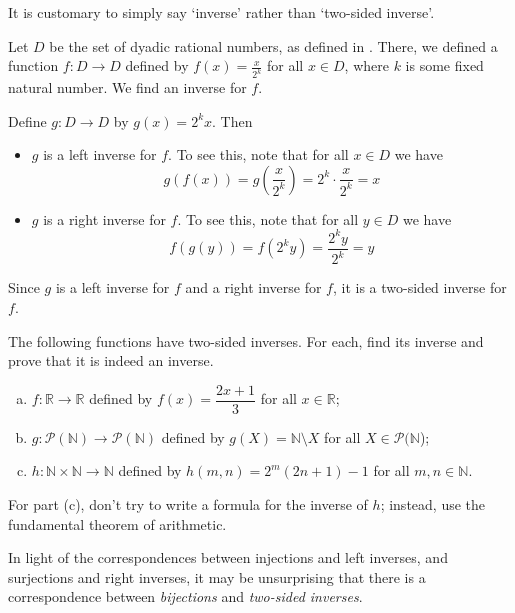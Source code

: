 It is customary to simply say `inverse' rather than `two-sided inverse'.

\begin{example}
Let $D$ be the set of dyadic rational numbers, as defined in . There, we defined a function $f : D \to D$ defined by $f(x)=\frac{x}{2^k}$ for all $x \in D$, where $k$ is some fixed natural number. We find an inverse for $f$.

Define $g : D \to D$ by $g(x) = 2^kx$. Then
\begin{itemize}
\item $g$ is a left inverse for $f$. To see this, note that for all $x \in D$ we have
\[ g(f(x)) = g(\frac{x}{2^k}) = 2^k \cdot \frac{x}{2^k} = x \]
\item $g$ is a right inverse for $f$. To see this, note that for all $y \in D$ we have
\[ f(g(y)) = f(2^ky) = \frac{2^ky}{2^k} = y \]
\end{itemize}
Since $g$ is a left inverse for $f$ and a right inverse for $f$, it is a two-sided inverse for $f$.
\end{example}

\begin{exercise}
\label{exFindTwoSidedInverses}
The following functions have two-sided inverses. For each, find its inverse and prove that it is indeed an inverse.
\begin{enumerate}[(a)]
\item $f : \mathbb{R} \to \mathbb{R}$ defined by $f(x)=\dfrac{2x+1}{3}$ for all $x \in \mathbb{R}$;
\item $g : \mathcal{P}(\mathbb{N}) \to \mathcal{P}(\mathbb{N})$ defined by $g(X) = \mathbb{N} \setminus X$ for all $X \in \mathcal{P}(\mathbb{N}$);
\item $h : \mathbb{N} \times \mathbb{N} \to \mathbb{N}$ defined by $h(m,n) = 2^m(2n+1)-1$ for all $m,n \in \mathbb{N}$.
\end{enumerate}
\begin{backhint}
For part (c), don't try to write a formula for the inverse of $h$; instead, use the fundamental theorem of arithmetic.
\end{backhint}
\end{exercise}

In light of the correspondences between injections and left inverses, and surjections and right inverses, it may be unsurprising that there is a correspondence between \textit{bijections} and \textit{two-sided inverses}.

